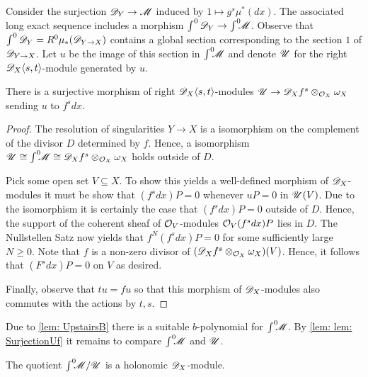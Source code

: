 Consider the surjection $\mathscr{D}_Y\to \mathscr{M}$ induced by $1 \mapsto g^s \mu^*(dx)$.
The associated long exact sequence includes a morphism $\int^0\mathscr{D}_Y \to \int^0 \mkern -8mu\mathscr{M}$.
Observe that $\int^0\mathscr{D}_Y = R^0 \mu_*(\mathscr{D}_{Y\to X})$ contains a global section corresponding to the section $1$ of $\mathscr{D}_{Y\to X}$.
Let $u$ be the image of this section in $\int^0 \mkern -8mu\mathscr{M}$ and denote $\mathscr{U}$ for the right $\mathscr{D}_X\langle s,t\rangle$-module generated by $u$.
\begin{lemma}\label{lem: SurjectiveUf}
  There is a surjective morphism of right $\mathscr{D}_X\langle s,t\rangle$-modules $\mathscr{U} \to \mathscr{D}_X f^s \otimes_{\mathcal{O}_X} \omega_X$ sending $u$ to $f^s dx$.
\end{lemma}
\begin{proof}
  The resolution of singularities $Y\to X$ is a isomorphism on the complement of the divisor $D$ determined by $f$.
  Hence, a isomorphism $\mathscr{U} \cong \int^0 \mkern -8mu \mathscr{M} \cong  \mathscr{D}_X f^s  \otimes_{\mathcal{O}_X}\omega_X$ holds outside of $D$.

  Pick some open set $V\subseteq X$. To show this yields a well-defined morphism of $\mathscr{D}_X$-modules it must be show that $(f^s dx)P = 0$ whenever $uP = 0$ in $\mathscr{U}(V)$.
  Due to the isomorphism it is certainly the case that $(f^s dx) P = 0$ outside of $D$.
  Hence, the support of the coherent sheaf of $\mathcal{O}_V$-modules $\mathcal{O}_V (f^s dx) P $ lies in $D$.
  The Nullstellen Satz now yields that $f^N (f^s dx) P  = 0$ for some sufficiently large $N\geq 0$.
  Note that $f$ is a non-zero divisor of $(\mathscr{D}_Xf^s\otimes_{\mathcal{O}_X} \omega_X)(V)$.
  Hence, it follows that $(F^s dx) P= 0$ on $V$ as desired.

  Finally, observe that $tu = fu$ so that this morphism of $\mathscr{D}_X$-modules also commutes with the actions by $t,s$.
\end{proof}
Due to \cref{lem: UpstairsB} there is a suitable $b$-polynomial for $\int^0 \mkern -8mu \mathscr{M}$.
By \cref{lem: lem: SurjectionUf} it remains to compare $\int^0 \mkern -8mu\mathscr{M}$ and $\mathscr{U}$.
\begin{lemma}\label{lem: QuotientHolonomic}
  The quotient $\int^0 \mkern -8mu\mathscr{M} / \mathscr{U}$ is a holonomic $\mathscr{D}_X$-module.
\end{lemma}
